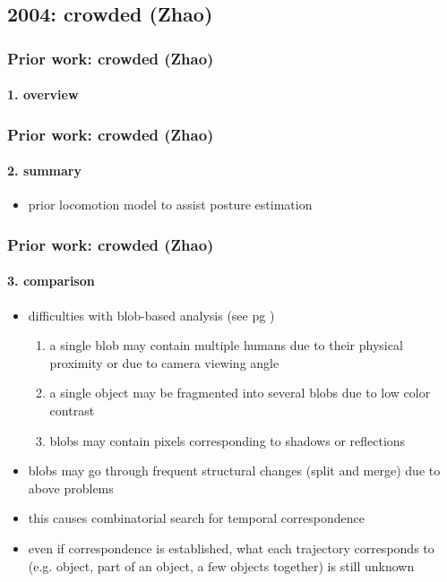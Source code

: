 \subsection{2004: crowded (Zhao)}
\begin{frame}
\frametitle{Prior work: crowded (Zhao)}
\framesubtitle{1. overview}
\logoCSIPCPL\mypagenum
{}
\end{frame}




\begin{frame}
\frametitle{Prior work: crowded (Zhao)}
\framesubtitle{2. summary}
\logoCSIPCPL\mypagenum
{}
	\begin{itemize}
		\item prior locomotion model to assist posture estimation
	\end{itemize}
\end{frame}



\begin{frame}
\frametitle{Prior work: crowded (Zhao)}
\framesubtitle{3. comparison}
\logoCSIPCPL\mypagenum	
{}	
	\begin{itemize}
		\item difficulties with blob-based analysis (see pg \pageref{fig:1})
			\begin{enumerate}
				\item a single blob may contain multiple humans due to their physical proximity or due to camera viewing angle
				\item a single object may be fragmented into several blobs due to low color contrast 
				\item blobs may contain pixels corresponding to shadows or reflections
			\end{enumerate}
				\item blobs may go through frequent structural changes (split and merge) due to above problems
				\item this causes combinatorial search for temporal correspondence
				\item even if correspondence is established, what each trajectory corresponds to (e.g. object, part of an object, a few objects together) is still unknown
	\end{itemize}
\end{frame}




